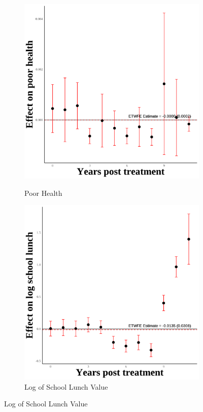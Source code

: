\documentclass[12pt,english]{article}
\begin{document}
\pagebreak

\begin{figure}[H]
  \caption{Effect of Immigration Enforcement on Second Generation Outcomes: WH Parents}
  \centering

  \begin{subfigure}[b]{0.3\textwidth}
    \centering
    \caption{Poor Health}
    \includegraphics[width=\linewidth]{figures/plot34-poor_health_event_study-secgen-wh.png}
    \label{fig:poor-health-secgen-wh}
  \end{subfigure}
  \hfill
  \begin{subfigure}[b]{0.3\textwidth}
    \centering
    \caption{Log of School Lunch Value}
    \includegraphics[width=\linewidth]{figures/plot42-ln_schl_lunch_event_study-secgen-wh.png}

\end{subfigure}
\end{figure}
\end{document}
